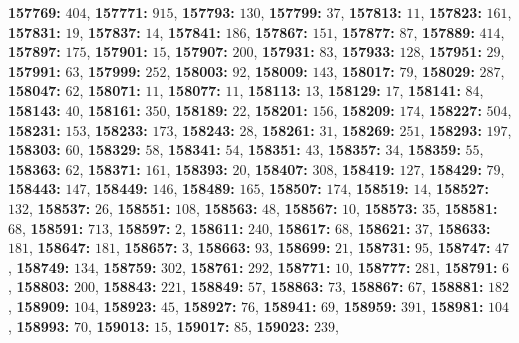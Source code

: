 \textsf{\bfseries 157769:} $404$, \textsf{\bfseries 157771:} $915$, \textsf{\bfseries 157793:} $130$, \textsf{\bfseries 157799:} $37$, \textsf{\bfseries 157813:} $11$, \textsf{\bfseries 157823:} $161$, \textsf{\bfseries 157831:} $19$, \textsf{\bfseries 157837:} $14$, \textsf{\bfseries 157841:} $186$, \textsf{\bfseries 157867:} $151$, \textsf{\bfseries 157877:} $87$, \textsf{\bfseries 157889:} $414$, \textsf{\bfseries 157897:} $175$, \textsf{\bfseries 157901:} $15$, \textsf{\bfseries 157907:} $200$, \textsf{\bfseries 157931:} $83$, \textsf{\bfseries 157933:} $128$, \textsf{\bfseries 157951:} $29$, \textsf{\bfseries 157991:} $63$, \textsf{\bfseries 157999:} $252$, \textsf{\bfseries 158003:} $92$, \textsf{\bfseries 158009:} $143$, \textsf{\bfseries 158017:} $79$, \textsf{\bfseries 158029:} $287$, \textsf{\bfseries 158047:} $62$, \textsf{\bfseries 158071:} $11$, \textsf{\bfseries 158077:} $11$, \textsf{\bfseries 158113:} $13$, \textsf{\bfseries 158129:} $17$, \textsf{\bfseries 158141:} $84$, \textsf{\bfseries 158143:} $40$, \textsf{\bfseries 158161:} $350$, \textsf{\bfseries 158189:} $22$, \textsf{\bfseries 158201:} $156$, \textsf{\bfseries 158209:} $174$, \textsf{\bfseries 158227:} $504$, \textsf{\bfseries 158231:} $153$, \textsf{\bfseries 158233:} $173$, \textsf{\bfseries 158243:} $28$, \textsf{\bfseries 158261:} $31$, \textsf{\bfseries 158269:} $251$, \textsf{\bfseries 158293:} $197$, \textsf{\bfseries 158303:} $60$, \textsf{\bfseries 158329:} $58$, \textsf{\bfseries 158341:} $54$, \textsf{\bfseries 158351:} $43$, \textsf{\bfseries 158357:} $34$, \textsf{\bfseries 158359:} $55$, \textsf{\bfseries 158363:} $62$, \textsf{\bfseries 158371:} $161$, \textsf{\bfseries 158393:} $20$, \textsf{\bfseries 158407:} $308$, \textsf{\bfseries 158419:} $127$, \textsf{\bfseries 158429:} $79$, \textsf{\bfseries 158443:} $147$, \textsf{\bfseries 158449:} $146$, \textsf{\bfseries 158489:} $165$, \textsf{\bfseries 158507:} $174$, \textsf{\bfseries 158519:} $14$, \textsf{\bfseries 158527:} $132$, \textsf{\bfseries 158537:} $26$, \textsf{\bfseries 158551:} $108$, \textsf{\bfseries 158563:} $48$, \textsf{\bfseries 158567:} $10$, \textsf{\bfseries 158573:} $35$, \textsf{\bfseries 158581:} $68$, \textsf{\bfseries 158591:} $713$, \textsf{\bfseries 158597:} $2$, \textsf{\bfseries 158611:} $240$, \textsf{\bfseries 158617:} $68$, \textsf{\bfseries 158621:} $37$, \textsf{\bfseries 158633:} $181$, \textsf{\bfseries 158647:} $181$, \textsf{\bfseries 158657:} $3$, \textsf{\bfseries 158663:} $93$, \textsf{\bfseries 158699:} $21$, \textsf{\bfseries 158731:} $95$, \textsf{\bfseries 158747:} $47$, \textsf{\bfseries 158749:} $134$, \textsf{\bfseries 158759:} $302$, \textsf{\bfseries 158761:} $292$, \textsf{\bfseries 158771:} $10$, \textsf{\bfseries 158777:} $281$, \textsf{\bfseries 158791:} $6$, \textsf{\bfseries 158803:} $200$, \textsf{\bfseries 158843:} $221$, \textsf{\bfseries 158849:} $57$, \textsf{\bfseries 158863:} $73$, \textsf{\bfseries 158867:} $67$, \textsf{\bfseries 158881:} $182$, \textsf{\bfseries 158909:} $104$, \textsf{\bfseries 158923:} $45$, \textsf{\bfseries 158927:} $76$, \textsf{\bfseries 158941:} $69$, \textsf{\bfseries 158959:} $391$, \textsf{\bfseries 158981:} $104$, \textsf{\bfseries 158993:} $70$, \textsf{\bfseries 159013:} $15$, \textsf{\bfseries 159017:} $85$, \textsf{\bfseries 159023:} $239$, 
